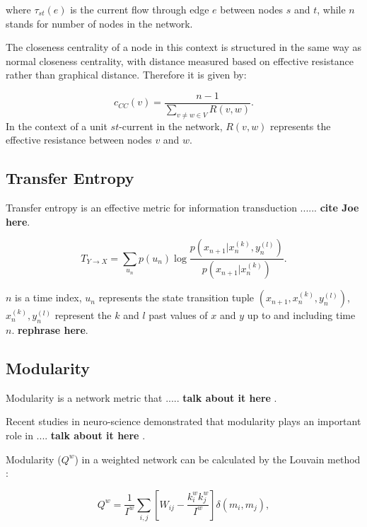 \documentclass[%
 reprint,
 amsmath,amssymb,
 aps,
]{revtex4-2}
\begin{document}
where $\tau_{st}(e)$ is the current flow through edge $e$ between nodes $s$ and $t$, while $n$ stands for number of nodes in the network.

The closeness centrality of a node in this context is structured in the same way as normal closeness centrality, with distance measured based on effective resistance rather than graphical distance. Therefore it is given by:

\begin{equation}
c_{CC}(v) = \frac{n-1}{\sum \limits_{v \neq w \in V} R(v,w)}.
\end{equation}
In the context of a unit $st$-current in the network, $R(v,w)$ represents the effective resistance between nodes $v$ and $w$.



\subsection{\label{sec:level2} Transfer Entropy}

Transfer entropy is an effective metric for information transduction ...... \textbf{cite Joe here}.

\begin{equation}
T_{Y \rightarrow X} = \sum \limits_{u_n} p(u_n) \log \frac{p(x_{n+1}| x_n^{(k)}, y_n^{(l)})}{p(x_{n+1}|x_n^{(k)})}.
\end{equation}

$n$ is a time index, $u_n$ represents the state transition tuple $(x_{n+1}, x_n^{(k)}, y_n^{(l)})$, $x_n^{(k)}, y_n^{(l)}$ represent the $k$ and $l$ past values of $x$ and $y$ up to and including time $n$. \textbf{rephrase here}.

\subsection{\label{sec:level2} Modularity}
Modularity is a network metric that ..... \textbf{talk about it here} \cite{Rubinov2009}.

Recent studies in neuro-science demonstrated that modularity plays an important role in .... \textbf{talk about it here} \cite{Godwin2015}. 
 
Modularity ($Q^w$) in a weighted network can be calculated by the Louvain method \cite{Blondel2008}:
 
\begin{equation}
Q^w = \frac{1}{I^w} \sum \limits_{i,j} \left[W_{ij} - \frac{k_i^w k_j^w}{I^w} \right] \delta(m_i, m_j),
\end{equation}
\end{document}
